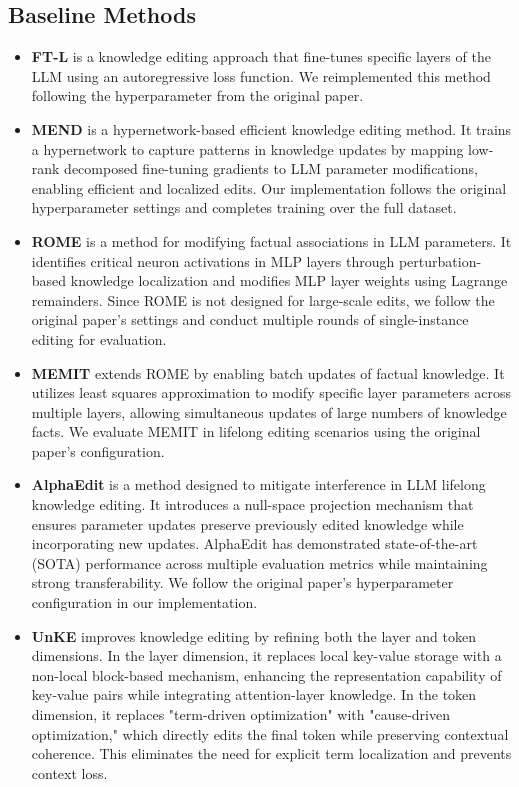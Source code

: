 \subsection{Baseline Methods}
\begin{itemize}
    \item \textbf{FT-L} \cite{FTw} is a knowledge editing approach that fine-tunes specific layers of the LLM using an autoregressive loss function. We reimplemented this method following the hyperparameter from the original paper.
    
    \item \textbf{MEND} \cite{MEND} is a hypernetwork-based efficient knowledge editing method. It trains a hypernetwork to capture patterns in knowledge updates by mapping low-rank decomposed fine-tuning gradients to LLM parameter modifications, enabling efficient and localized edits. Our implementation follows the original hyperparameter settings and completes training over the full dataset. 
    
    \item \textbf{ROME} \cite{ROME} is a method for modifying factual associations in LLM parameters. It identifies critical neuron activations in MLP layers through perturbation-based knowledge localization and modifies MLP layer weights using Lagrange remainders. Since ROME is not designed for large-scale edits, we follow the original paper’s settings and conduct multiple rounds of single-instance editing for evaluation.
    
    \item \textbf{MEMIT} \cite{MEMIT} extends ROME by enabling batch updates of factual knowledge. It utilizes least squares approximation to modify specific layer parameters across multiple layers, allowing simultaneous updates of large numbers of knowledge facts. We evaluate MEMIT in lifelong editing scenarios using the original paper’s configuration.
    
    \item \textbf{AlphaEdit} \cite{AlphaEdit} is a method designed to mitigate interference in LLM lifelong knowledge editing. It introduces a null-space projection mechanism that ensures parameter updates preserve previously edited knowledge while incorporating new updates. AlphaEdit has demonstrated state-of-the-art (SOTA) performance across multiple evaluation metrics while maintaining strong transferability. We follow the original paper’s hyperparameter configuration in our implementation.
    
    \item \textbf{UnKE} \cite{UnKE} improves knowledge editing by refining both the layer and token dimensions. In the layer dimension, it replaces local key-value storage with a non-local block-based mechanism, enhancing the representation capability of key-value pairs while integrating attention-layer knowledge. In the token dimension, it replaces "term-driven optimization" with "cause-driven optimization," which directly edits the final token while preserving contextual coherence. This eliminates the need for explicit term localization and prevents context loss.
\end{itemize}

